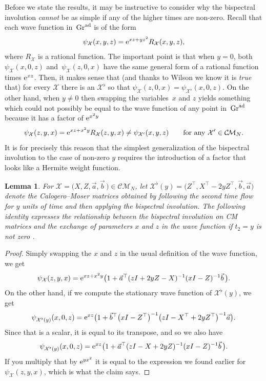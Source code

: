 \documentclass[10pt,a4paper]{amsart}
\numberwithin{equation}{section}
\newtheorem{Lemma}[Theorem]{Lemma}
\theoremstyle{definition}
\def\X{\mathcal{X}}
\def\CM{\mathcal{C\!M}}
\begin{document}
Before we state the results, it may be instructive to consider why the
bispectral involution \textit{cannot} be as simple if any of the
higher times are non-zero. Recall that each wave function in~${\rm Gr}^{\rm ad}$ is of the form
\[
\psi_{\X}(x,y,z)={\rm e}^{xz + y z^2}R_{\X}(x,y,z),
\]
where $R_{\X}$ is a rational function.
The important point is that when $y=0$, both $\psi_{\X}(x,0,z)$ and~$\psi_{\X}(z,0,x)$
have the same general form of a rational function times ${\rm e}^{xz}$.
Then, it makes sense that (and thanks to Wilson \cite{WilsonBisp,WilsonCM} we
know it is \textit{true} that) for every $\X$ there is an $\X^{\flat}$
so that $\psi_{\X}(z,0,x)=\psi_{\X^{\flat}}(x,0,z)$. On the other
hand, when $y\not=0$ then swapping the variables~$x$ and $z$ yields
something which could not possibly be equal to the wave function of
any point in~${\rm Gr}^{\rm ad}$ because it has a factor of ${\rm e}^{x^2y}$
\[
\psi_{\X}(z,y,x)={\rm e}^{xz+x^2y}R_{\X}(z,y,x)\not=\psi_{\X'}(x,y,z) \qquad\text{for
any}\ \X'\in\CM_N.
\]
It is for precisely this reason that
 the simplest
generalization of the bispectral involution to the case of non-zero $y$ requires the
introduction of a
factor that looks like a Hermite weight function.

\begin{Lemma}\label{lem:bispy}
For $\X=\bigl(X,Z,\vec a,\vec b\,\bigr)\in\CM_N$, let
$\X^{\flat}(y)=\bigl(Z^{\top},X^{\top}-2yZ^{\top},\vec b,\vec a\bigr)$ denote
the Calogero--Moser matrices obtained by following the second time flow
for $y$ units of time and then applying the bispectral involution.
The following identity expresses the
relationship between the bispectral involution on CM matrices and the
exchange of parameters $x$ and $z$ in the wave function if $t_2=y$ is not zero
\smash{$%
\psi_{\X}(z,y,x)={\rm e}^{yx^2}\psi_{\X^{\flat}(y)}(x,0,z)$}.
\end{Lemma}
\begin{proof}
Simply swapping the $x$ and $z$ in the usual definition of the wave
function, we get
\[
 \psi_{\X}(z,y,x)={\rm e}^{xz+x^2y}\bigl(1+\vec
 a^{\top}(zI+2yZ-X)^{-1}(xI-Z)^{-1}\vec b\,\bigr).
\]
On the other hand, if we compute the stationary wave function of
$\X^{\flat}(y)$, we get
\[
\psi_{\X^\flat(y)}(x,0,z)={\rm e}^{xz}\bigl(1+\vec b^\top
 \bigl(xI-Z^\top\bigr)^{-1}\bigl(zI-X^\top+2yZ^\top\bigr)^{-1}\vec a\bigr).
\]
Since that is a scalar, it is equal to its transpose, and so we also
have
\[
\psi_{\X^\flat(y)}(x,0,z)={\rm e}^{xz}\bigl(1+\vec a^\top
 (zI-X+2yZ)^{-1}(xI-Z)^{-1}\vec b\,\bigr).
\]
If you multiply that by ${\rm e}^{yx^2}$ it is equal to the
expression we found earlier for $\psi_{\X}(z,y,x)$, which is what the
claim says.
\end{proof}
\end{document}
